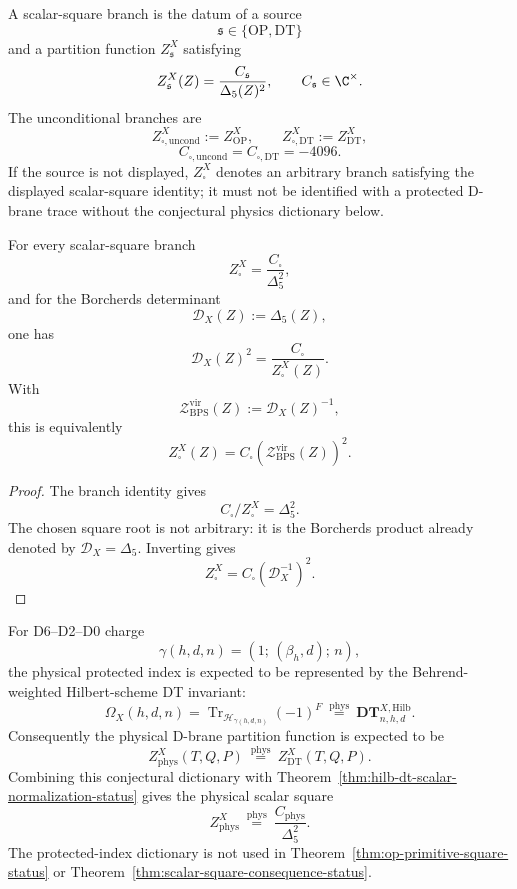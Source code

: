 \begin{definition}
\label{def:scalar-square-branch-status}
A scalar-square branch is the datum of a source
$$\mathfrak s\in\{\mathrm{OP},\mathrm{DT}\}$$
and a partition function $Z^X_{\mathfrak s}$ satisfying
$$
Z^X_{\mathfrak s}(Z)=\frac{C_{\mathfrak s}}{\Delta_5(Z)^2},
\qquad C_{\mathfrak s}\in\C^\times.
$$
The unconditional branches are
$$
Z^X_{\square,\mathrm{uncond}}:=Z^X_{\mathrm{OP}},
\qquad
Z^X_{\square,\mathrm{DT}}:=Z^X_{\mathrm{DT}},
$$
$$
C_{\square,\mathrm{uncond}}=C_{\square,\mathrm{DT}}=-4096.
$$
If the source is not displayed, $Z^X_\square$ denotes an arbitrary
branch satisfying the displayed scalar-square identity; it must not be
identified with a protected D-brane trace without the conjectural
physics dictionary below.
\end{definition}

\begin{theorem}
\label{thm:scalar-square-consequence-status}
For every scalar-square branch
$$Z^X_\square=\frac{C_\square}{\Delta_5^2},$$
and for the Borcherds determinant
$$\mathcal D_X(Z):=\Delta_5(Z),$$
one has
$$
\mathcal D_X(Z)^2=\frac{C_\square}{Z^X_\square(Z)}.
$$
With
$$\mathcal Z_{\mathrm{BPS}}^{\mathrm{vir}}(Z):=\mathcal D_X(Z)^{-1},$$
this is equivalently
$$
Z^X_\square(Z)
=C_\square\left(\mathcal Z_{\mathrm{BPS}}^{\mathrm{vir}}(Z)\right)^2.
$$
\end{theorem}

\begin{proof}
The branch identity gives
$$C_\square/Z^X_\square=\Delta_5^2.$$
The chosen square root is not arbitrary: it is the Borcherds product
already denoted by $\mathcal D_X=\Delta_5$.  Inverting gives
$$Z^X_\square=C_\square(\mathcal D_X^{-1})^2.$$
\end{proof}

\begin{conjecture}
\label{conj:protected-index-dictionary-status}
For D6--D2--D0 charge
$$\gamma(h,d,n)=(1;\,(\beta_h,d);\,n),$$
the physical protected index is expected to be represented by the
Behrend-weighted Hilbert-scheme DT invariant:
$$
\Omega_X(h,d,n)
=\operatorname{Tr}_{\mathcal H_{\gamma(h,d,n)}}(-1)^F
\ \stackrel{\mathrm{phys}}{=}\ 
\mathbf{DT}^{X,\mathrm{Hilb}}_{n,h,d}.
$$
Consequently the physical D-brane partition function is expected to be
$$
Z^X_{\mathrm{phys}}(T,Q,P)
\ \stackrel{\mathrm{phys}}{=}\ 
Z^X_{\mathrm{DT}}(T,Q,P).
$$
Combining this conjectural dictionary with
Theorem~\ref{thm:hilb-dt-scalar-normalization-status} gives the physical
scalar square
$$
Z^X_{\mathrm{phys}}
\ \stackrel{\mathrm{phys}}{=}\ 
\frac{C_{\mathrm{phys}}}{\Delta_5^2}.
$$
The protected-index dictionary is not used in
Theorem~\ref{thm:op-primitive-square-status} or
Theorem~\ref{thm:scalar-square-consequence-status}.
\end{conjecture}

